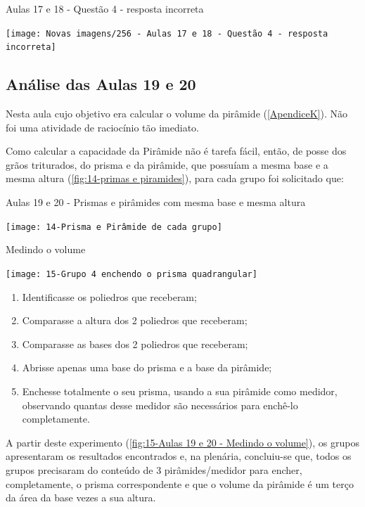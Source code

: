 \begin{CenteredFigure}
    \caption{Aulas 17 e 18 - Questão 4 - resposta incorreta} \label{fig: 256 - Aulas 17 e 18 - Questao 4 - resposta incorreta}
    \texttt{[image: Novas imagens/256 - Aulas 17 e 18 - Questão 4 - resposta incorreta]}
    \legend{\autoria}
\end{CenteredFigure}

\subsection{Análise das Aulas 19 e 20}

Nesta aula cujo objetivo era calcular o volume da pirâmide (\autoref{ApendiceK}). Não foi uma atividade de raciocínio tão imediato.

Como calcular a capacidade da Pirâmide não é tarefa fácil, então, de posse dos grãos triturados, do prisma e da pirâmide, que possuíam a mesma base e a mesma altura (\autoref{fig:14-primas e piramides}), para cada grupo foi solicitado que:

\begin{CenteredFigure}
    \caption{Aulas 19 e 20 - Prismas e pirâmides com mesma base e mesma altura} \label{fig:14-primas e piramides}
    \texttt{[image: 14-Prisma e Pirâmide de cada grupo]}
    \legend{\autoria}
\end{CenteredFigure}

\begin{CenteredFigure}
    \caption{Medindo o volume} \label{fig:15-Aulas 19 e 20 - Medindo o volume}
    \texttt{[image: 15-Grupo 4 enchendo o prisma quadrangular]}
    \legend{\autoria}
\end{CenteredFigure}

\begin{enumerate}
    \item Identificasse os poliedros que receberam;
    \item Comparasse a altura dos 2 poliedros que receberam;
    \item Comparasse as bases dos 2 poliedros que receberam;
    \item Abrisse apenas uma base do prisma e a base da pirâmide;
    \item Enchesse totalmente o seu prisma, usando a sua pirâmide como medidor, observando quantas desse medidor são necessários para enchê-lo completamente.
\end{enumerate}

A partir deste experimento (\autoref{fig:15-Aulas 19 e 20 - Medindo o volume}), os grupos apresentaram os resultados encontrados e, na plenária, concluiu-se que, todos os grupos precisaram do conteúdo de 3 pirâmides/medidor para encher, completamente, o prisma correspondente e que o volume da pirâmide é um terço da área da base vezes a sua altura.

